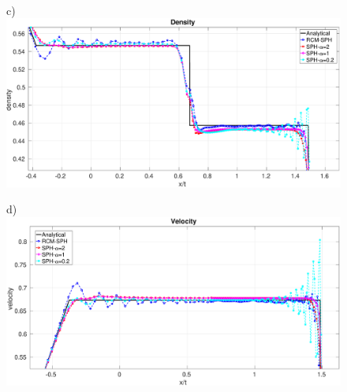 \documentclass[review]{elsarticle}
\begin{document}
\begin{figure}[htp]
    \\
    \begin{minipage}{.495\textwidth}
        \centering c)
        \includegraphics[width=0.99 \textwidth,height=0.7\textwidth]{./Figures/Sod/RCM-Sod-SPH-alf-rho-zoom}
    \end{minipage}%
    \begin{minipage}{.495 \textwidth}
        \centering d)
        \includegraphics[width=0.99 \textwidth,height=0.7\textwidth]{./Figures/Sod/RCM-Sod-SPH-alf-v-zoom}

\end{minipage}
\end{figure}
\end{document}
